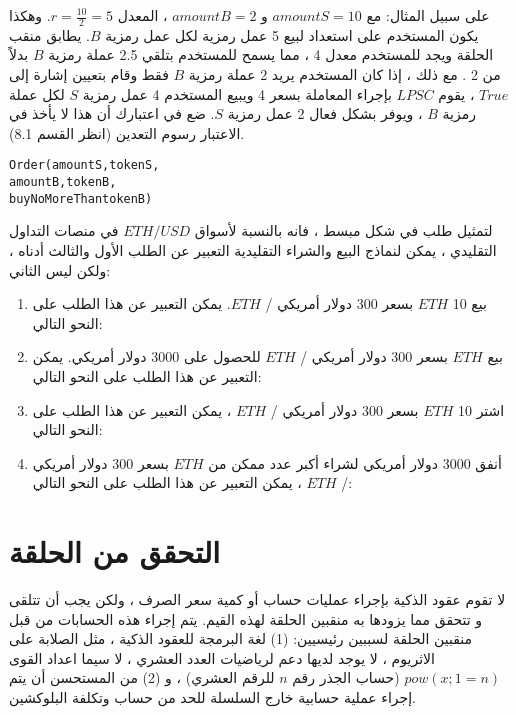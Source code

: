 \documentclass[12pt, a4paper, leqno]{report}
\theoremstyle{plain}
\theoremstyle{definition}
\begin{document}
\begin{multicols}{2}
\begin{otherlanguage}{arabic}
على سبيل المثال: مع $amountS = 10$ و $amountB = 2$ ، المعدل $r= \frac{10}{2} = 5$. وهكذا يكون المستخدم على استعداد لبيع 5 عمل رمزية لكل عمل رمزية $B$. يطابق منقب الحلقة ويجد للمستخدم معدل 4 ، مما يسمح للمستخدم بتلقي 2.5 عملة رمزية $B$ بدلاً من 2 . مع ذلك ، إذا كان المستخدم يريد 2 عملة رمزية $B$ فقط وقام بتعيين إشارة  إلى $True$ ، يقوم $LPSC$ بإجراء المعاملة بسعر 4 ويبيع المستخدم 4 عمل رمزية $S$ لكل عملة رمزية $B$ ، ويوفر بشكل فعال 2 عمل رمزية $S$. ضع في اعتبارك أن هذا لا يأخذ في الاعتبار رسوم التعدين (انظر القسم 8.1).


\begin{otherlanguage}{english}
\begin{verbatim}
Order(amountS,tokenS,
amountB,tokenB,
buyNoMoreThantokenB)
\end{verbatim}
\end{otherlanguage}

لتمثيل طلب في شكل مبسط ، فانه بالنسبة لأسواق $ETH / USD$ في منصات التداول  التقليدي ، يمكن لنماذج البيع والشراء التقليدية التعبير عن الطلب الأول والثالث أدناه ، ولكن ليس الثاني:
\begin{enumerate}
  \item بيع 10 $ETH$ بسعر 300 دولار أمريكي / $ETH$. يمكن التعبير عن هذا الطلب على النحو التالي:
  
  \item بيع $ETH$ بسعر 300 دولار أمريكي / $ETH$  للحصول على 3000 دولار أمريكي. يمكن التعبير عن هذا الطلب على النحو التالي:
  
  \item اشتر 10 $ETH$ بسعر 300 دولار أمريكي / $ETH$  ، يمكن التعبير عن هذا الطلب على النحو التالي:
  
  \item أنفق 3000 دولار أمريكي لشراء أكبر عدد ممكن من $ETH$ بسعر 300 دولار أمريكي / $ETH$ ، يمكن التعبير عن هذا الطلب على النحو التالي:
  
\end{enumerate}
\end{otherlanguage}
\section{التحقق من الحلقة}
\begin{otherlanguage}{arabic}
لا تقوم عقود  الذكية بإجراء عمليات حساب أو كمية سعر الصرف ، ولكن يجب أن تتلقى و تتحقق مما يزودها به منقبين الحلقة لهذه القيم. يتم إجراء هذه الحسابات من قبل منقبين الحلقة لسببين رئيسيين: (1) لغة البرمجة للعقود الذكية ، مثل الصلابة  على الاثريوم ، لا يوجد لديها دعم لرياضيات العدد العشري ، لا سيما اعداد القوى $pow(x; 1=n)$ (حساب الجذر رقم $n$ للرقم العشري) ، و (2) من المستحسن أن يتم إجراء عملية حسابية خارج السلسلة للحد من حساب وتكلفة البلوكشين.

\end{otherlanguage}
\end{multicols}
\end{document}
